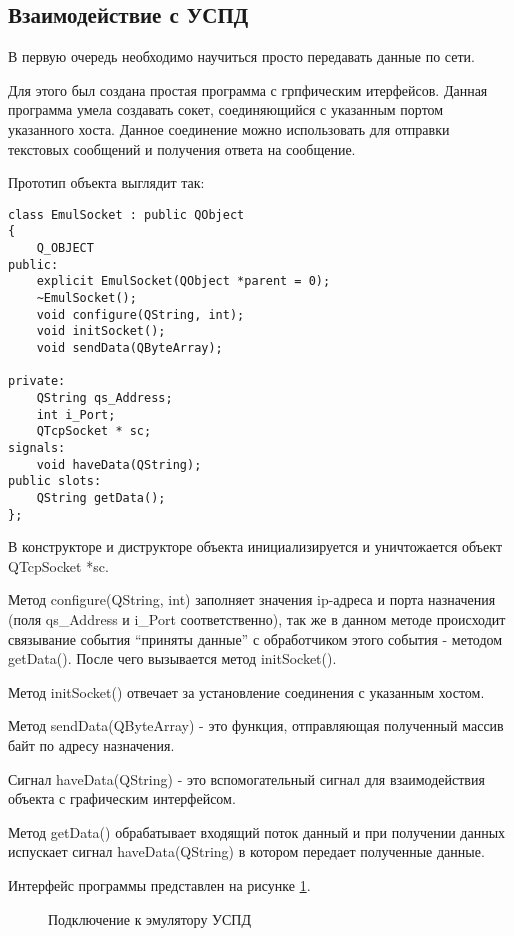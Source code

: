 \subsection{Взаимодействие с УСПД}

В первую очередь необходимо научиться просто передавать данные по сети. 

Для этого был создана простая программа с грпфическим итерфейсов. Данная программа умела создавать сокет, соединяющийся с указанным портом указанного хоста. Данное соединение можно использовать для отправки текстовых сообщений и получения ответа на сообщение. 

Прототип объекта выглядит так:

\begin{lstlisting}
class EmulSocket : public QObject
{
    Q_OBJECT
public:
    explicit EmulSocket(QObject *parent = 0);
    ~EmulSocket();
    void configure(QString, int);
    void initSocket();
    void sendData(QByteArray);

private:
    QString qs_Address;
    int i_Port;
    QTcpSocket * sc;
signals:
    void haveData(QString);
public slots:
    QString getData();
};
\end{lstlisting}

В конструкторе и диструкторе объекта инициализируется и уничтожается объект QTcpSocket *sc.

Метод configure(QString, int) заполняет значения ip-адреса и порта назначения (поля qs\_Address и i\_Port соответственно), так же в данном методе происходит связывание события ``приняты данные'' с обработчиком этого события - методом getData(). После чего вызывается метод initSocket().

Метод initSocket() отвечает за установление соединения с указанным хостом.

Метод sendData(QByteArray) - это функция, отправляющая полученный массив байт по адресу назначения.

Сигнал haveData(QString) - это вспомогательный сигнал для взаимодействия объекта с графическим интерфейсом.

Метод getData() обрабатывает входящий поток данный и при получении данных испускает сигнал haveData(QString) в котором передает полученные данные.

Интерфейс программы представлен на рисунке \ref{window1:window1}.

\begin{figure}[h!]
 \caption{Подключение к эмулятору УСПД}
 \label{window1:window1}
\end{figure}

